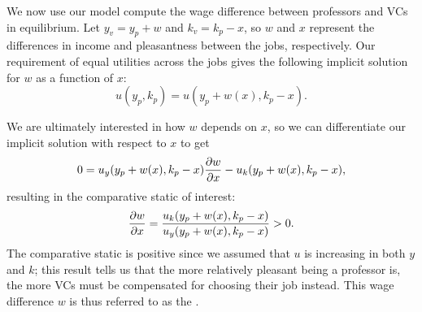 We now use our model compute the wage difference between professors and VCs in equilibrium. Let $y_v = y_p + w$ and $k_v = k_p - x$, so $w$ and $x$ represent the differences in income and pleasantness between the jobs, respectively. Our requirement of equal utilities across the jobs gives the following implicit solution for $w$ as a function of $x$:
$$u(y_p, k_p) = u(y_p + w(x), k_p - x).$$

We are ultimately interested in how $w$ depends on $x$, so we can differentiate our implicit solution with respect to $x$ to get 
$$0 = u_y(y_p + w(x), k_p - x)\pdv{w}{x} - u_k(y_p + w(x), k_p - x),$$
resulting in the comparative static of interest:
$$\pdv{w}{x} = \frac{u_k(y_p + w(x), k_p - x)}{u_y(y_p + w(x), k_p - x)} > 0.$$
The comparative static is positive since we assumed that $u$ is increasing in both $y$ and $k$; this result tells us that the more relatively pleasant being a professor is, the more VCs must be compensated for choosing their job instead. This wage difference $w$ is thus referred to as the .



